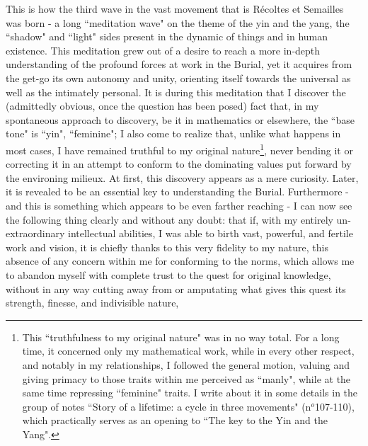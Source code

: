 This is how the third wave in the vast movement that is R\'ecoltes et Semailles was born - a long ``meditation wave" on the theme of the yin and the yang, the ``shadow" and ``light" sides present in the dynamic of things and in human existence. This meditation grew out of a desire to reach a more in-depth understanding of the profound forces at work in the Burial, yet it acquires from the get-go its own autonomy and unity, orienting itself towards the universal as well as the intimately personal. It is during this meditation that I discover the (admittedly obvious, once the question has been posed) fact that, in my spontaneous approach to discovery, be it in mathematics or elsewhere, the ``base tone" is ``yin", ``feminine"; I also come to realize that, unlike what happens in most cases, I have remained truthful to my original nature\footnote{This ``truthfulness to my original nature" was in no way total. For a long time, it concerned only my mathematical work, while in every other respect, and notably in my relationships, I followed the general motion, valuing and giving primacy to those traits within me perceived as ``manly", while at the same time repressing ``feminine" traits. I write about it in some details in the group of notes ``Story of a lifetime: a cycle in three movements" (n$^o$107-110), which practically serves as an opening to ``The key to the Yin and the Yang".}, never bending it or correcting it in an attempt to conform to the dominating values put forward by the environing milieux. At first, this discovery appears as a mere curiosity. Later, it is revealed to be an essential key to understanding the Burial. Furthermore - and this is something which appears to be even farther reaching - I can now see the following thing clearly and without any doubt: that if, with my entirely un-extraordinary intellectual abilities, I was able to birth vast, powerful, and fertile work and vision, it is chiefly thanks to this very fidelity to my nature, this absence of any concern within me for conforming to the norms, which allows me to abandon myself with complete trust to the quest for original knowledge, without in any way cutting away from or amputating what gives this quest its strength, finesse, and indivisible nature,

